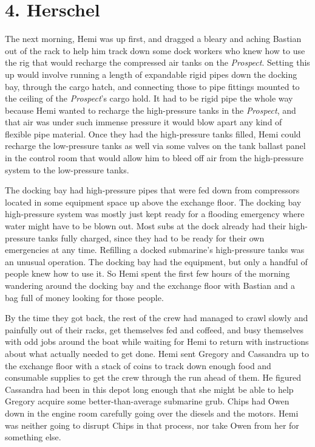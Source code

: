 \documentclass[
]{scrbook}
\begin{document}
\newpage

\hypertarget{herschel}{%
\section{4. Herschel}\label{herschel}}

The next morning, Hemi was up first, and dragged a bleary and aching
Bastian out of the rack to help him track down some dock workers who
knew how to use the rig that would recharge the compressed air tanks on
the \emph{Prospect}. Setting this up would involve running a length of
expandable rigid pipes down the docking bay, through the cargo hatch,
and connecting those to pipe fittings mounted to the ceiling of the
\emph{Prospect}'s cargo hold. It had to be rigid pipe the whole way
because Hemi wanted to recharge the high-pressure tanks in the
\emph{Prospect}, and that air was under such immense pressure it would
blow apart any kind of flexible pipe material. Once they had the
high-pressure tanks filled, Hemi could recharge the low-pressure tanks
as well via some valves on the tank ballast panel in the control room
that would allow him to bleed off air from the high-pressure system to
the low-pressure tanks.

The docking bay had high-pressure pipes that were fed down from
compressors located in some equipment space up above the exchange floor.
The docking bay high-pressure system was mostly just kept ready for a
flooding emergency where water might have to be blown out. Most subs at
the dock already had their high-pressure tanks fully charged, since they
had to be ready for their own emergencies at any time. Refilling a
docked submarine's high-pressure tanks was an unusual operation. The
docking bay had the equipment, but only a handful of people knew how to
use it. So Hemi spent the first few hours of the morning wandering
around the docking bay and the exchange floor with Bastian and a bag
full of money looking for those people.

By the time they got back, the rest of the crew had managed to crawl
slowly and painfully out of their racks, get themselves fed and coffeed,
and busy themselves with odd jobs around the boat while waiting for Hemi
to return with instructions about what actually needed to get done. Hemi
sent Gregory and Cassandra up to the exchange floor with a stack of
coins to track down enough food and consumable supplies to get the crew
through the run ahead of them. He figured Cassandra had been in this
depot long enough that she might be able to help Gregory acquire some
better-than-average submarine grub. Chips had Owen down in the engine
room carefully going over the diesels and the motors. Hemi was neither
going to disrupt Chips in that process, nor take Owen from her for
something else.
\end{document}
